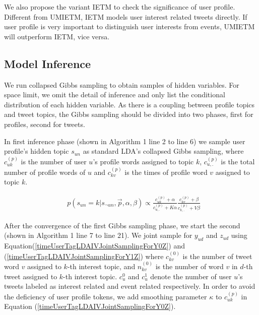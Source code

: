 \documentclass[runningheads,a4paper]{llncs}
\begin{document}
We also propose the variant IETM to check the significance of user profile.
Different from UMIETM, IETM models user interest related tweets directly. 
If user profile is very important to distinguish user interests from events, UMIETM will outperform IETM, vice versa.

\subsection{Model Inference}
We run collapsed Gibbs sampling to obtain samples of hidden variables.
For space limit, we omit the detail of inference and only list the conditional distribution of each hidden variable.
As there is a coupling between profile topics and tweet topics, the Gibbs sampling should be divided into two phases, first for profiles, second for tweets.

In first inference phase (shown in Algorithm 1 line 2 to line 6) we sample user profile's hidden topic \(s_{un}\) as standard LDA's collapsed Gibbs sampling\cite{griffiths2004finding}, where \(c^{(p)}_{uk}\) is the number of user \(u\)'s profile words assigned to topic \(k\), \(c^{(p)}_{u,.}\) is the total number of profile words of \(u\) and \(c^{(p)}_{kv}\) is the times of profile word \(v\) assigned to topic \(k\).
\begin{scriptsize}
\begin{equation}
\label{timeUserTagLDAIVsamplingForS}
\begin{aligned}
&p(s_{un}=k|s_{\neg{un}},\vec{p},\alpha,\beta)
\propto \frac{c^{(p)}_{uk}+\alpha}{c^{(p)}_{u,.}+K\alpha}
\frac{c^{(p)}_{kv}+\beta}{c^{(p)}_{k,.}+V\beta}
\end{aligned}
\end{equation}
\end{scriptsize}


After the convergence of the first Gibbs sampling phase, we start the second (shown in Algorithm 1 line 7 to line 21).
We joint sample for \(y_{ud}\) and \(z_{ud}\) using Equation(\ref{timeUserTagLDAIVJointSamplingForY0Z}) and (\ref{timeUserTagLDAIVJointSamplingForY1Z}) where \(c^{(0)}_{kv}\) is the number of tweet word \(v\) assigned to \(k\)-th interest topic, and \(n^{(0)}_{kv}\) is the number of word \(v\) in \(d\)-th tweet assigned to \(k\)-th interest topic.
\(c_u^{0}\) and \(c_u^{1}\) denote the number of user \(u\)'s tweets labeled as interest related and event related respectively.
In order to avoid the deficiency of user profile tokens, we add smoothing parameter \(\kappa\) to \(c^{(p)}_{uk}\) in Equation (\ref{timeUserTagLDAIVJointSamplingForY0Z}).
\end{document}
